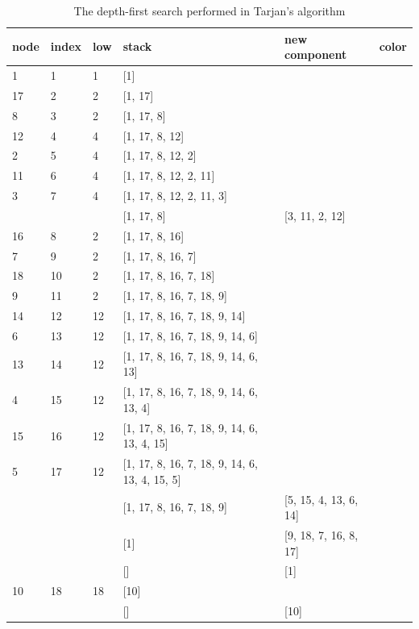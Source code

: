 \documentclass{l4proj}
\begin{document}
\begin{table}[H]
\centering
\begin{tabular}{|l|l|l|l|l|l|}
\hline
node & index & low & stack & new component & color \\
\hline
1& 1 & 1 & [1] & & \cellcolor{babyblue} \\
\hline
17& 2 & 2 & [1, 17] & & \cellcolor{yellow} \\
\hline
8& 3 & 2 & [1, 17, 8] & & \cellcolor{yellow} \\
\hline
12& 4 & 4 & [1, 17, 8, 12] & & \cellcolor{amber} \\
\hline
2& 5 & 4 & [1, 17, 8, 12, 2] & & \cellcolor{amber} \\
\hline
11& 6 & 4 & [1, 17, 8, 12, 2, 11] & & \cellcolor{amber} \\
\hline
3& 7 & 4 & [1, 17, 8, 12, 2, 11, 3] & & \cellcolor{amber} \\
\hline
& & & [1, 17, 8] & [3, 11, 2, 12] & \\
\hline
16& 8 & 2 & [1, 17, 8, 16] & & \cellcolor{yellow} \\
\hline
7& 9 & 2 & [1, 17, 8, 16, 7] & & \cellcolor{yellow} \\
\hline
18& 10 & 2 & [1, 17, 8, 16, 7, 18] & & \cellcolor{yellow} \\
\hline
9& 11 & 2 & [1, 17, 8, 16, 7, 18, 9] & & \cellcolor{yellow} \\
\hline
14& 12 & 12 & [1, 17, 8, 16, 7, 18, 9, 14] & & \cellcolor{applegreen} \\
\hline
6& 13 & 12 & [1, 17, 8, 16, 7, 18, 9, 14, 6] & & \cellcolor{applegreen} \\
\hline
13& 14 & 12 & [1, 17, 8, 16, 7, 18, 9, 14, 6, 13] & & \cellcolor{applegreen} \\
\hline
4& 15 & 12 & [1, 17, 8, 16, 7, 18, 9, 14, 6, 13, 4] & & \cellcolor{applegreen} \\
\hline
15& 16 & 12 & [1, 17, 8, 16, 7, 18, 9, 14, 6, 13, 4, 15] & & \cellcolor{applegreen} \\
\hline
5& 17 & 12 & [1, 17, 8, 16, 7, 18, 9, 14, 6, 13, 4, 15, 5] & & \cellcolor{applegreen} \\
\hline
& & & [1, 17, 8, 16, 7, 18, 9] & [5, 15, 4, 13, 6, 14] & \\
\hline
& & & [1] & [9, 18, 7, 16, 8, 17] & \\
\hline
& & & [] & [1] & \\
\hline
10& 18 & 18 & [10] & & \cellcolor{americanrose} \\
\hline
& & & [] & [10] & \\
\hline
\end{tabular}
\caption{The depth-first search performed in Tarjan's algorithm}
\label{tarjantable}
\end{table}
\end{document}
